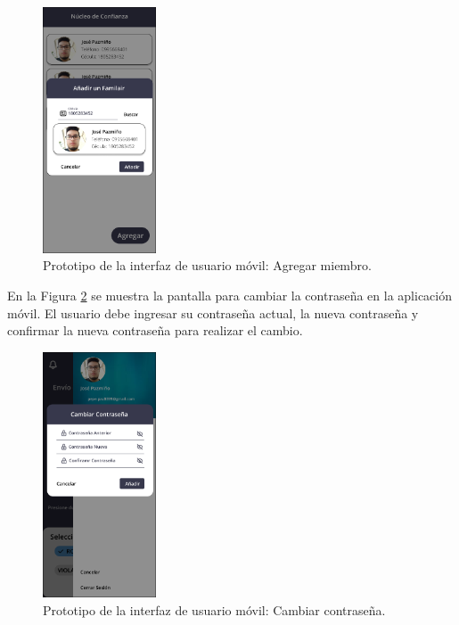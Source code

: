 \begin{figure}[H]
    \centering
    \includegraphics[width=0.3\textwidth]{chapters/III-resultados-y-discusion/resources/images/prototipo-agregar-miembro-mobile.png}
    \caption{Prototipo de la interfaz de usuario móvil: Agregar miembro.}
    \label{fig:prototipo-agregar-miembro-mobile}
\end{figure}

En la Figura \ref{fig:prototipo-cambiar-contrasena-mobile} se muestra la pantalla para cambiar la contraseña en la aplicación móvil. El usuario
debe ingresar su contraseña actual, la nueva contraseña y confirmar la nueva contraseña para realizar el cambio.

\begin{figure}[H]
    \centering
    \includegraphics[width=0.3\textwidth]{chapters/III-resultados-y-discusion/resources/images/prototipo-cambiar-contrasena-mobile.png}
    \caption{Prototipo de la interfaz de usuario móvil: Cambiar contraseña.}
    \label{fig:prototipo-cambiar-contrasena-mobile}
\end{figure}
